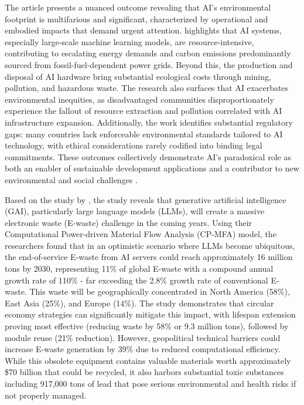 \documentclass[a4paper, 12pt]{article}
\begin{document}
\par The article presents a nuanced outcome revealing that AI's environmental footprint is multifarious and significant, characterized by operational and embodied impacts that demand urgent attention. \citet{Zhuk2023} highlights that AI systems, especially large-scale machine learning models, are resource-intensive, contributing to escalating energy demands and carbon emissions predominantly sourced from fossil-fuel-dependent power grids. Beyond this, the production and disposal of AI hardware bring substantial ecological costs through mining, pollution, and hazardous waste. The research also surfaces that AI exacerbates environmental inequities, as disadvantaged communities disproportionately experience the fallout of resource extraction and pollution correlated with AI infrastructure expansion. Additionally, the work identifies substantial regulatory gaps: many countries lack enforceable environmental standards tailored to AI technology, with ethical considerations rarely codified into binding legal commitments. These outcomes collectively demonstrate AI's paradoxical role as both an enabler of sustainable development applications and a contributor to new environmental and social challenges \citep[pp.~950--955]{Zhuk2023}. \hfill \break
\par Based on the study by \citet{wang_2024_ewaste}, the study reveals that generative artificial intelligence (GAI), particularly large language models (LLMs), will create a massive electronic waste (E-waste) challenge in the coming years. Using their Computational Power-driven Material Flow Analysis (CP-MFA) model, the researchers found that in an optimistic scenario where LLMs become ubiquitous, the end-of-service E-waste from AI servers could reach approximately 16 million tons by 2030, representing 11\% of global E-waste with a compound annual growth rate of 110\% - far exceeding the 2.8\% growth rate of conventional E-waste. This waste will be geographically concentrated in North America (58\%), East Asia (25\%), and Europe (14\%). The study demonstrates that circular economy strategies can significantly mitigate this impact, with lifespan extension proving most effective (reducing waste by 58\% or 9.3 million tons), followed by module reuse (21\% reduction). However, geopolitical technical barriers could increase E-waste generation by 39\% due to reduced computational efficiency. While this obsolete equipment contains valuable materials worth approximately \$70 billion that could be recycled, it also harbors substantial toxic substances including 917,000 tons of lead that pose serious environmental and health risks if not properly managed.\hfill \break 
\end{document}
